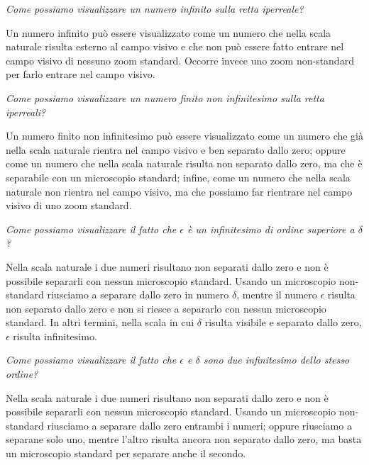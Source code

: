 \begin{esercizio}\label{ese:iper_039} 
\emph{Come possiamo visualizzare un numero infinito sulla retta iperreale?}

Un numero infinito può essere visualizzato come un numero che nella scala 
naturale risulta esterno al campo visivo e che non può essere fatto entrare 
nel campo visivo di nessuno zoom standard. Occorre invece uno zoom 
non-standard per farlo entrare nel campo visivo.
\end{esercizio}

\begin{esercizio}\label{ese:iper_040} 
\emph{Come possiamo visualizzare un numero finito non infinitesimo sulla 
retta iperreali?}

Un numero finito non infinitesimo può essere visualizzato come un numero 
che già nella scala naturale rientra nel campo visivo e ben separato dallo 
zero; 
oppure come un numero che nella scala naturale risulta non separato dallo 
zero, ma che è separabile con un microscopio standard; 
infine, come un numero che nella scala naturale non rientra nel campo 
visivo, ma che possiamo far rientrare nel campo visivo di uno zoom standard.
\end{esercizio}

\begin{esercizio}\label{ese:iper_041} 
\emph{Come possiamo visualizzare il fatto che \(\epsilon\) è un 
infinitesimo di ordine superiore a \(\delta\)?}

Nella scala naturale i due numeri risultano non separati dallo zero e non è 
possibile separarli con nessun microscopio standard. Usando un microscopio 
non-standard riusciamo a separare dallo zero in numero \(\delta\), mentre 
il numero \(\epsilon\) risulta non separato dallo zero e non si riesce a 
separarlo con nessun microscopio standard. In altri termini, nella scala in 
cui \(\delta\) risulta visibile e separato dallo zero, \(\epsilon\) risulta 
infinitesimo.
\end{esercizio}

\begin{esercizio}\label{ese:iper_042} 
\emph{Come possiamo visualizzare il fatto che \(\epsilon\) e \(\delta\) 
sono due infinitesimo dello stesso ordine?}

Nella scala naturale i due numeri risultano non separati dallo zero e non è 
possibile separarli con nessun microscopio standard. Usando un microscopio 
non-standard riusciamo a separare dallo zero entrambi i numeri; oppure 
riusciamo a separane solo uno, mentre l'altro risulta ancora non separato 
dallo zero, ma basta un microscopio standard per separare anche il secondo.
\end{esercizio}

